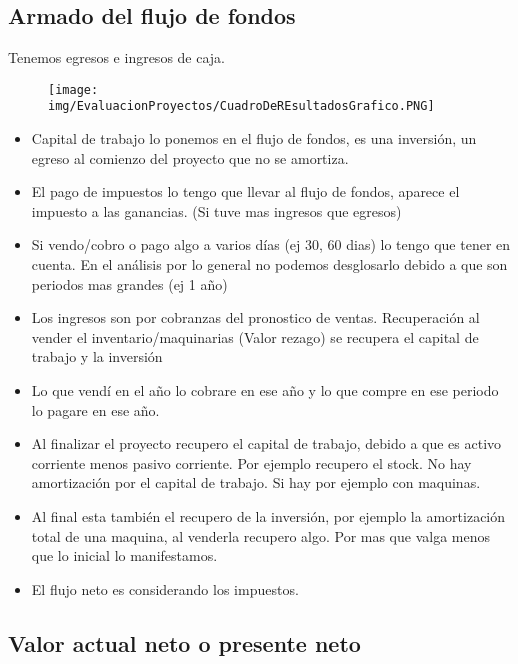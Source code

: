 \documentclass[titlepage,a4paper]{article}
\begin{document}
\newpage
\subsection{Armado del flujo de fondos}
Tenemos egresos e ingresos de caja.

\begin{figure}[!htb]
    \centering
    \texttt{[image: img/EvaluacionProyectos/CuadroDeREsultadosGrafico.PNG]}
\end{figure}

\begin{itemize}
\item Capital de trabajo lo ponemos en el flujo de fondos, es una inversión, un egreso al comienzo del proyecto que no se amortiza.
\item El pago de impuestos lo tengo que llevar al flujo de fondos, aparece el impuesto a las ganancias. (Si tuve mas ingresos que egresos)
\item Si vendo/cobro o pago algo a varios días (ej 30, 60 dias) lo tengo que tener en cuenta. En el análisis por lo general no podemos desglosarlo debido a que son periodos mas grandes (ej 1 año)
\item Los ingresos son por cobranzas del pronostico de ventas. Recuperación al vender el inventario/maquinarias (Valor rezago) se recupera el capital de trabajo y la inversión
\item Lo que vendí en el año lo cobrare en ese año y lo que compre en ese periodo lo pagare en ese año.
\item Al finalizar el proyecto recupero el capital de trabajo, debido a que es activo corriente menos pasivo corriente. Por ejemplo recupero el stock. No hay amortización por el capital de trabajo. Si hay por ejemplo con maquinas.
\item Al final esta también el recupero de la inversión, por ejemplo la amortización total de una maquina, al venderla recupero algo. Por mas que valga menos que lo inicial lo manifestamos.
\item El flujo neto es considerando los impuestos.
\end{itemize}



\newpage
\subsection{Valor actual neto o presente neto}
\end{document}
